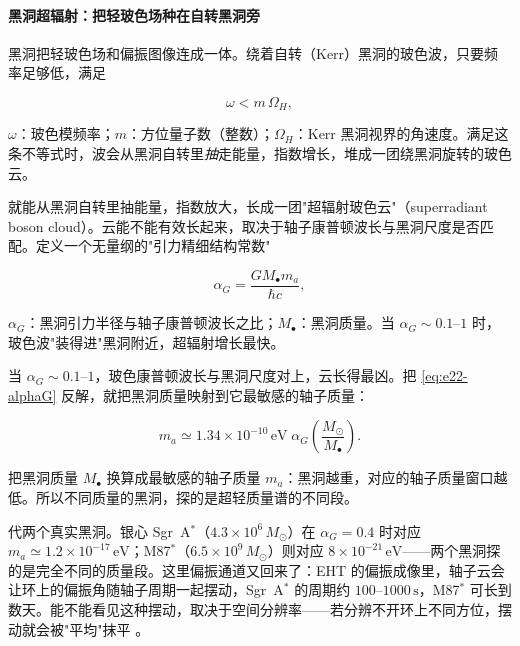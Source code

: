 \paragraph{黑洞超辐射：把轻玻色场种在自转黑洞旁}

黑洞把轻玻色场和偏振图像连成一体。绕着自转（Kerr）黑洞的玻色波，只要频率足够低，满足

\begin{equation}
  \omega<m\,\Omega_H,
  \label{eq:e22-superradiance}
\end{equation}
\begin{formulaexplain}
\(\omega\)：玻色模频率；\(m\)：方位量子数（整数）；\(\Omega_H\)：Kerr 黑洞视界的角速度。满足这条不等式时，波会从黑洞自转里\emph{抽}走能量，指数增长，堆成一团绕黑洞旋转的玻色云。
\end{formulaexplain}

就能从黑洞自转里抽能量，指数放大，长成一团"超辐射玻色云"（superradiant boson cloud）。云能不能有效长起来，取决于轴子康普顿波长与黑洞尺度是否匹配。定义一个无量纲的"引力精细结构常数"

\begin{equation}
  \alpha_G=\frac{G M_\bullet m_a}{\hbar c},
  \label{eq:e22-alphaG}
\end{equation}
\begin{formulaexplain}
\(\alpha_G\)：黑洞引力半径与轴子康普顿波长之比；\(M_\bullet\)：黑洞质量。当 \(\alpha_G\sim0.1\text{--}1\) 时，玻色波"装得进"黑洞附近，超辐射增长最快。
\end{formulaexplain}

当 \(\alpha_G\sim0.1\text{--}1\)，玻色康普顿波长与黑洞尺度对上，云长得最凶。把 \eqref{eq:e22-alphaG} 反解，就把黑洞质量映射到它最敏感的轴子质量：

\begin{equation}
  m_a\simeq 1.34\times10^{-10}\,\mathrm{eV}\;\alpha_G
  \left(\frac{M_\odot}{M_\bullet}\right).
  \label{eq:e22-bh-mass}
\end{equation}
\begin{formulaexplain}
把黑洞质量 \(M_\bullet\) 换算成最敏感的轴子质量 \(m_a\)：黑洞越重，对应的轴子质量窗口越低。所以不同质量的黑洞，探的是超轻质量谱的不同段。
\end{formulaexplain}

代两个真实黑洞。银心 Sgr~A\(^*\)（\(4.3\times10^6\,M_\odot\)）在 \(\alpha_G=0.4\) 时对应 \(m_a\simeq1.2\times10^{-17}\,\mathrm{eV}\)；M87\(^*\)（\(6.5\times10^9\,M_\odot\)）则对应 \(8\times10^{-21}\,\mathrm{eV}\)——两个黑洞探的是完全不同的质量段。这里偏振通道又回来了：EHT 的偏振成像里，轴子云会让环上的偏振角随轴子周期一起摆动，Sgr~A\(^*\) 的周期约 \(100\text{--}1000\,\mathrm s\)，M87\(^*\) 可长到数天。能不能看见这种摆动，取决于空间分辨率——若分辨不开环上不同方位，摆动就会被"平均"抹平 \citep{2015LNP...906.....B,2015CQGra..32m4001B,2017PhRvD..96c5019B,2020PhRvL.124f1102C,2022NatAs...6..592C}。

